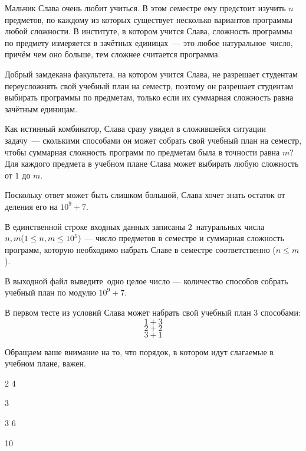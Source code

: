 
Мальчик Слава очень любит учиться. В этом семестре ему предстоит изучить $n$ предметов, по каждому из которых существует несколько вариантов программы любой сложности. В институте, в котором учится Слава, сложность программы по предмету измеряется в зачётных единицах — это любое натуральное число, причём чем оно больше, тем сложнее считается программа.

Добрый замдекана факультета, на котором учится Слава, не разрешает студентам переусложнять свой учебный план на семестр, поэтому он разрешает студентам выбирать программы по предметам, только если их суммарная сложность равна  зачётным единицам.

Как истинный комбинатор, Слава сразу увидел в сложившейся ситуации задачу~— сколькими способами он может собрать свой учебный план на семестр, чтобы суммарная сложность программ по предметам была в точности равна $m$? Для каждого предмета в учебном плане Слава может выбирать любую сложность от $1$ до $m$.

Поскольку ответ может быть слишком большой, Слава хочет знать остаток от деления его на $10^9 + 7$.


В единственной строке входных данных записаны $2$ натуральных числа \linebreak $n, m\space (1\leq n, m\leq 10^5)$ — число предметов в семестре и суммарная сложность программ, которую необходимо набрать Славе в семестре соответственно ($n \leq m$).  
\outputfmtSection

В выходной файл выведите одно целое число — количество способов собрать учебный план по модулю $10^9 + 7$.

\explanationSection

В первом тесте из условий Слава может набрать свой учебный план $3$ способами:
$$1+3$$ $$2+2$$ $$3+1$$

Обращаем ваше внимание на то, что порядок, в котором идут слагаемые в учебном плане, важен.


\begin{myverbbox}[\small]{\vinput}
    2 4
\end{myverbbox}

\begin{myverbbox}[\small]{\voutput}
    3
\end{myverbbox}


\begin{myverbbox}[\small]{\vinput}
    3 6
\end{myverbbox}

\begin{myverbbox}[\small]{\voutput}
    10
\end{myverbbox}


